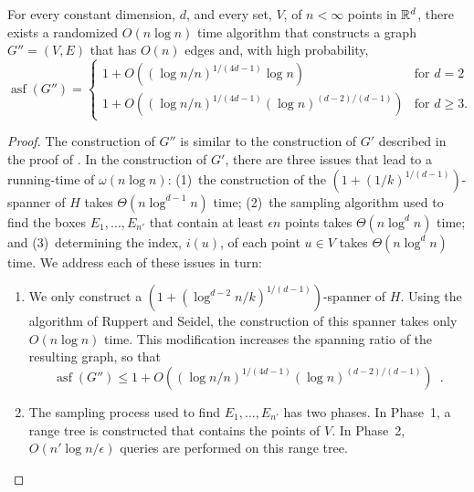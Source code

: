 \documentclass{patmorin}
\DeclareMathOperator{\asf}{asf}
\begin{document}
\begin{thm}
  For every constant dimension, $d$, and every set, $V$, of $n<\infty$
  points in $\mathbb{R}^d$, there exists a randomized $O(n\log n )$ time
  algorithm that constructs a graph $G''=(V,E)$ that has $O(n)$ edges
  and, with high probability, 
  \[
    \asf(G'')=
       \begin{cases}
             1+O\left((\log n/n)^{1/(4d-1)}\log n\right) 
                & \text{for $d = 2$} \\
             1+O\left((\log n/n)^{1/(4d-1)}(\log n)^{(d-2)/(d-1)}\right) 
                & \text{for $d\ge 3$.}
       \end{cases}
  \]
\end{thm}

\begin{proof}
  The construction of $G''$ is similar to the construction of
  $G'$ described in the proof of .  In the
  construction of $G'$, there are three issues that lead to a
  running-time of $\omega(n\log n)$: (1)~the construction of the
  $(1+(1/k)^{1/(d-1)})$-spanner of $H$ takes $\Theta(n\log^{d-1} n)$ time;
  (2)~the sampling algorithm used to find the boxes $E_1,\ldots,E_{n'}$
  that contain at least $\epsilon n$ points takes $\Theta(n\log^{d} n)$
  time; and (3)~determining the index, $i(u)$, of each point $u\in V$
  takes $\Theta(n\log^d n)$ time.  
  We address each of these issues in turn:  
  \begin{enumerate}
     \item We only construct a $(1+(\log^{d-2}
      n/k)^{1/(d-1)})$-spanner of $H$.  Using the algorithm of Ruppert
      and Seidel, the construction of this spanner takes only $O(n\log
      n)$ time.  This modification increases the spanning ratio of the 
      resulting graph, so that 
      \[
         \asf(G'') \le 1 
             + O\left((\log n/n)^{1/(4d-1)}(\log n)^{(d-2)/(d-1)}\right) \enspace .
      \]

     \item The sampling process used to find $E_1,\ldots,E_{n'}$
     has two phases.  In Phase~1, a range tree is constructed
     that contains the points of $V$.  In Phase~2, $O(n'\log
     n/\epsilon)$ queries are performed on this range tree.


\end{enumerate}
\end{proof}
\end{document}
